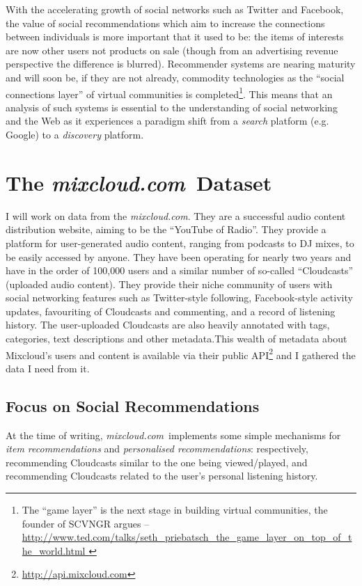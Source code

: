 \documentclass[a4paper,12pt,twoside,notitlepage]{report}
\def\mixurl{\emph{mixcloud.com}}
\begin{document}
With the accelerating growth of social networks such as Twitter and Facebook, 
the value of social recommendations which aim to increase the connections 
between individuals is more important that it used to be: the items of 
interests are now other users not products on sale (though from an advertising 
revenue perspective the difference is blurred). Recommender systems are nearing 
maturity and will soon be, if they are not already, commodity technologies as 
the ``social connections layer'' of virtual communities is completed\footnote{
The ``game layer'' is the next stage in building virtual communities, the 
founder of SCVNGR argues -- \url{
http://www.ted.com/talks/seth_priebatsch_the_game_layer_on_top_of_the_world.html
}}. 
This means that an analysis of such systems is essential to the understanding 
of social networking and the Web as it experiences a paradigm shift from a 
\emph{search} platform (e.g. Google) to a \emph{discovery} platform.


\section{The \mixurl\ Dataset}

I will work on data from the \mixurl. They are a successful audio content
distribution website, aiming to be the ``YouTube of Radio''. They provide a
platform for user-generated audio content, ranging from podcasts to DJ mixes, to
be easily accessed by anyone. They have been operating for nearly two years and
have in the order of 100,000 users and a similar number of
so-called ``Cloudcasts'' (uploaded audio content). They provide
their niche community of users with social networking features such as
Twitter-style following, Facebook-style activity updates, favouriting of
Cloudcasts and commenting, and a record of listening history. 
The user-uploaded Cloudcasts are also heavily annotated with tags, categories, 
text descriptions and other metadata.This wealth of metadata about Mixcloud's
users and content is available via their
public API\footnote{\url{http://api.mixcloud.com}} and I gathered the data I
need from it.

\subsection{Focus on Social Recommendations}
At the time of writing, \mixurl\ implements some simple mechanisms for 
\emph{item recommendations} and \emph{personalised recommendations}: 
respectively, recommending Cloudcasts similar to the one being viewed/played,
and recommending Cloudcasts related to the user's personal listening history. 
\end{document}
